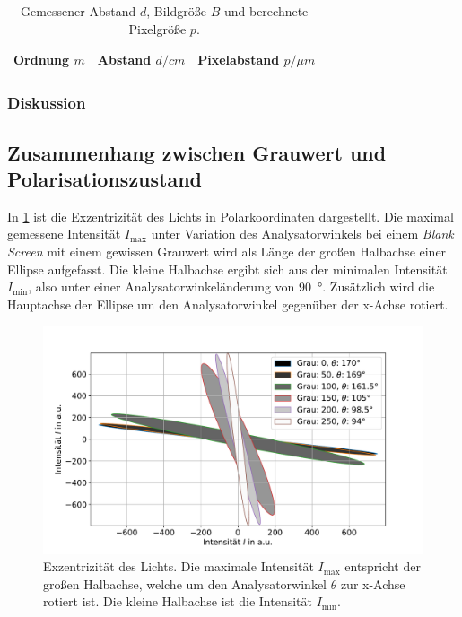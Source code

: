 \documentclass[
	a4paper,
	12pt,
	pagesize,
	ngerman
]{scrartcl}
\begin{document}
\begin{table}[H]
		\centering
		\begin{tabular}{ c | c | c }
			 Ordnung $m$ & Abstand $d/\si{cm}$ & Pixelabstand $p/\si{\mu m}$ \\ \hline
			 
		\end{tabular}
		\caption{
		Gemessener Abstand $d$, Bildgröße $B$ und berechnete Pixelgröße $p$.
		}
		\label{tb_gitter}
\end{table}
			\subsubsection*{Diskussion}

		\subsection{Zusammenhang zwischen Grauwert und Polarisationszustand}
		In \cref{fig_ellipse} ist die Exzentrizität des Lichts in Polarkoordinaten dargestellt.
		Die maximal gemessene Intensität $I_\text{max}$ unter Variation des Analysatorwinkels bei einem \textit{Blank Screen} mit einem gewissen Grauwert wird als Länge der großen Halbachse einer Ellipse aufgefasst.
		Die kleine Halbachse ergibt sich aus der minimalen Intensität $I_\text{min}$, also unter einer Analysatorwinkeländerung von \SI{90}{\degree}.
		Zusätzlich wird die Hauptachse der Ellipse um den Analysatorwinkel gegenüber der x-Achse rotiert.


\begin{figure}[H]
			\includegraphics[width=1\linewidth]{img/ellipse}
			\caption{
			Exzentrizität des Lichts. Die maximale Intensität $I_\text{max}$ entspricht der großen Halbachse, welche um den Analysatorwinkel $\theta$ zur x-Achse rotiert ist. Die kleine Halbachse ist die Intensität $I_\text{min}$.
			\protect\footnotemark
			}
			\label{fig_ellipse}
	\end{figure}
\end{document}
